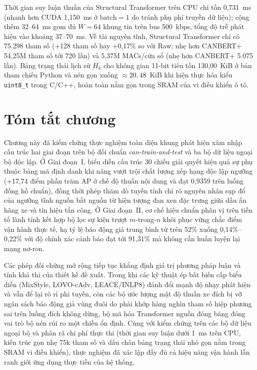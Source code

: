 \documentclass[12pt, a4paper, reqno, oneside]{book}
\begin{document}
Thời gian suy luận thuần của Structural Transformer trên CPU chỉ tốn 0,731~ms (nhanh hơn CUDA 1,150~ms ở $\text{batch}=1$ do tránh phụ phí truyền dữ liệu); cộng thêm 32--64~ms gom đủ $W=64$ khung tin trên bus 500~kbps, tổng độ trễ phát hiện vào khoảng 37--70~ms. Về tài nguyên tĩnh, Structural Transformer chỉ có 75.298 tham số (+128 tham số hay +0,17\% so với Raw; nhẹ hơn CANBERT+ 54,25M tham số tới 720 lần) và 5,37M MACs/cửa sổ (nhẹ hơn CANBERT+ 5.075 lần). Bảng trạng thái lịch sử $H_k$ cho không gian 11-bit tiêu tốn 130,00~KiB ở bản tham chiếu Python và nén gọn xuống $\approx 20{,}48$~KiB khi hiện thực hóa kiểu \texttt{uint8\_t} trong C/C++, hoàn toàn nằm gọn trong SRAM của vi điều khiển ô tô.

\section{Tóm tắt chương}\label{sec:exp-summary}

Chương này đã kiểm chứng thực nghiệm toàn diện khung phát hiện xâm nhập cấu trúc hai giai đoạn trên bộ đối chuẩn \textit{can-train-and-test} và ba bộ dữ liệu ngoại bộ độc lập. Ở Giai đoạn~I, biểu diễn cấu trúc 30 chiều giải quyết hiệu quả sự phụ thuộc bảng mã định danh khi nâng vượt trội chất lượng xếp hạng độc lập ngưỡng (+17,74 điểm phần trăm AP ở chế độ thuần nội dung và đạt 0,9359 trên luồng đồng hồ chuẩn), đồng thời phép thăm dò tuyến tính chỉ rõ nguyên nhân sụp đổ của ngưỡng tĩnh nguồn bắt nguồn từ hiện tượng đan xen đặc trưng giữa dấu ấn hãng xe và tín hiệu tấn công. Ở Giai đoạn~II, cơ chế hiệu chuẩn phân vị trên tiền tố lành tính kết hợp bộ lọc sự kiện trượt $m$-trong-$n$ khôi phục vững chắc điểm vận hành thực tế, hạ tỷ lệ báo động giả trung bình từ trên 52\% xuống 0,14\%--0,22\% với độ chính xác cảnh báo đạt tới 91,31\% mà không cần huấn luyện lại mạng nơ-ron.

Các phép đối chứng mở rộng tiếp tục khẳng định giá trị phương pháp luận và tính khả thi của thiết kế đề xuất. Trong khi các kỹ thuật ép bất biến cấp biểu diễn (MixStyle, LOVO-cAdv, LEACE/INLP8) đánh đổi mạnh độ nhạy phát hiện và vẫn để lại rò rỉ phi tuyến, còn các bộ ước lượng mật độ thuần xe đích bị vỡ ngân sách báo động giả vùng đuôi do phải khớp hàng nghìn tham số hiệp phương sai trên luồng đích không dừng, bộ mã hóa Transformer nguồn đóng băng đóng vai trò bộ nén rủi ro một chiều ổn định. Cùng với kiểm chứng trên các bộ dữ liệu ngoại bộ và phân rã chi phí thực thi (thời gian suy luận dưới 1~ms trên CPU, kiến trúc gọn nhẹ 75k tham số và dấu chân bảng trạng thái nhỏ gọn nằm trong SRAM vi điều khiển), thực nghiệm đã xác lập đầy đủ cả hiệu năng vận hành lẫn ranh giới ứng dụng thực tiễn của hệ thống.
\end{document}
